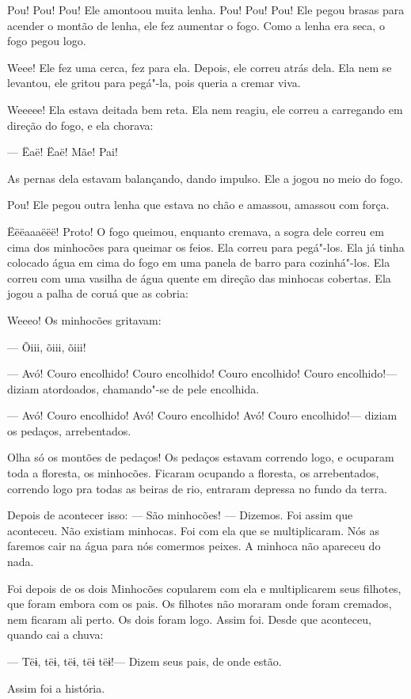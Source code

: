 Pou! Pou! Pou! Ele amontoou muita lenha. Pou! Pou! Pou! Ele pegou
brasas para acender o montão de lenha, ele fez aumentar o fogo. Como a
lenha era seca, o fogo pegou logo. 

Weee! Ele fez uma cerca, fez para ela. Depois, ele correu atrás dela.
Ela nem se levantou, ele gritou para pegá"-la, pois queria a cremar viva. 

Weeeee! Ela estava deitada bem reta. Ela nem reagiu, ele correu a carregando
em direção do fogo, e ela chorava: 

--- Ëaë! Ëaë! Mãe! Pai! 

As pernas dela estavam balançando, dando impulso. Ele a jogou no meio
do fogo. 

Pou! Ele pegou outra lenha que estava no chão e amassou, amassou com
força. 

Ëëëaaaëëë! Proto! O fogo queimou, enquanto cremava, a sogra dele correu
em cima dos minhocões para queimar os feios. Ela correu para pegá"-los.
Ela já tinha colocado água em cima do fogo em uma panela de barro para
cozinhá"-los. Ela correu com uma vasilha de água quente em direção das
minhocas cobertas. Ela jogou a palha de coruá que as cobria: 

Weeeo! Os minhocões gritavam:

--- Õiii, õiii, õiii! 

--- Avó! Couro encolhido! Couro encolhido! Couro encolhido! Couro
encolhido!--- diziam atordoados, chamando"-se de pele encolhida. 

--- Avó! Couro encolhido! Avó! Couro encolhido! Avó! Couro encolhido!---
diziam os pedaços, arrebentados. 

Olha só os montões de pedaços! Os pedaços estavam correndo logo, e
ocuparam toda a floresta, os minhocões. Ficaram ocupando a floresta, os
arrebentados, correndo logo pra todas as beiras de rio, entraram depressa
no fundo da terra. 

Depois de acontecer isso: --- São minhocões! --- Dizemos. Foi assim que aconteceu.
Não existiam minhocas. Foi com ela que se multiplicaram. Nós as faremos
cair na água para nós comermos peixes. A minhoca não apareceu do nada. 

Foi depois de os dois Minhocões copularem com ela e multiplicarem seus
filhotes, que foram embora com os pais. Os filhotes não moraram onde
foram cremados, nem ficaram ali perto. Os dois foram logo. Assim foi. Desde
que aconteceu, quando cai a chuva:

--- Tëɨ, tëɨ, tëɨ, tëɨ tëɨ!--- Dizem seus pais, de onde estão. 

Assim foi a história.

